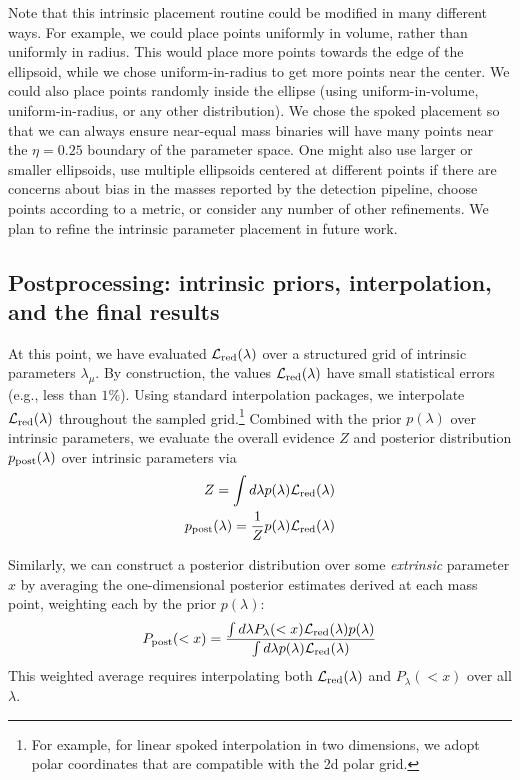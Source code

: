 Note that this intrinsic placement routine could be modified in many different ways. For example, 
we could place points uniformly in volume, rather than uniformly in radius. This would place more points
towards the edge of the ellipsoid, while we chose uniform-in-radius to get more points near the center.
We could also place points randomly inside the ellipse (using uniform-in-volume, uniform-in-radius, 
or any other distribution). We chose the spoked placement so that we can always ensure near-equal mass binaries
will have many points near the $\eta = 0.25$ boundary of the parameter space.
One might also use larger or smaller ellipsoids, use multiple ellipsoids centered at different points if there are concerns
about bias in the masses reported by the detection pipeline, choose points according to a metric, 
or consider any number of other refinements. We plan to refine the intrinsic parameter placement in future work.

\subsection{Postprocessing: intrinsic priors, interpolation, and the final results}

At this point, we have evaluated ${\cal L}_{\rm red}(\lambda)$ over a structured grid of intrinsic parameters $\lambda_\mu$.  
%
By construction,  the values ${\cal L}_{\rm red}(\lambda)$ have small statistical errors (e.g., less than $1\%$).   Using standard
interpolation packages, we interpolate ${\cal L}_{\rm red}(\lambda)$ throughout the sampled grid.\footnote{For example, for linear
spoked interpolation in two dimensions, we adopt polar coordinates that are compatible with the 2d polar grid.}
%
Combined with the prior $p(\lambda)$ over intrinsic parameters, we evaluate the overall evidence $Z$ and posterior
distribution $p_{\rm post}(\lambda)$ over intrinsic parameters via
\begin{eqnarray}
Z = \int d\lambda p(\lambda) {\cal L}_{\rm red}(\lambda) \\
p_{\rm post}(\lambda) = \frac{1}{Z} p(\lambda) {\cal L}_{\rm red}(\lambda)
\end{eqnarray}
%

Similarly, we can construct a posterior distribution over some \emph{extrinsic} parameter $x$ by averaging the one-dimensional posterior estimates derived at
each mass point, weighting each by the prior $p(\lambda)$:
\begin{eqnarray}
P_{\rm post}(<x) = \frac{\int d\lambda P_\lambda(<x) {\cal L}_{\rm red}(\lambda) p(\lambda)}{\int d \lambda p(\lambda) {\cal L}_{\rm red}(\lambda)}
\end{eqnarray}
This weighted average requires interpolating both ${\cal L}_{\rm red}(\lambda)$ and $P_\lambda(<x)$ over all $\lambda$.  


